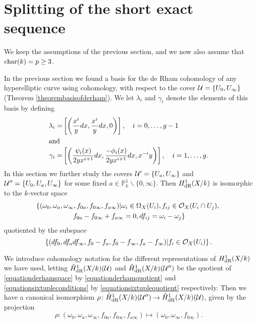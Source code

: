
\section{Splitting of the short exact sequence}


We keep the assumptions of the previous section, and we now also assume that $\operatorname{char}(k) = p \geq 3$.

In the previous section we found a basis for the de Rham cohomology of any hyperelliptic curve using \cech cohomology, with respect to the cover ${\mathcal U} = \{ U_0 , U_\infty\}$ (Theorem \ref{theorembasisofderham}).
We let $\lambda_i$ and $\gamma_i$ denote the elements of this basis by defining
    \begin{align*}
    \lambda_i  = & \left[ \left( \frac{x^i}{y}dx, \frac{x^i}{y}dx, 0\right) \right] ,\quad i=0, \ldots, g-1 \\
    \intertext{and}
    \gamma_i = & \left[ \left ( \frac{\psi_i(x)}{2yx^{i+1}}dx, \frac{-\phi_i(x)}{2yx^{i+1}}dx, x^{-i}y \right) \right], \quad i=1,\ldots ,g.
    \end{align*}
In this section we further study the covers ${\mathcal U}' = \{U_a, U_\infty\}$ and ${\mathcal U}'' = \{U_0, U_a, U_\infty\}$ for some fixed $a \in \mathbb{P}_k^1\backslash \{0, \infty\}$.
Then $H_{\text {dR}}^1(X/k)$ is isomorphic to the $k$-vector space 
    \begin{multline}\label{equationsixtupleconditions}
    \left\{ (\omega_0, \omega_a, \omega_\infty , f_{0a}, f_{0 \infty},f_{a \infty}) | \omega_i \in \Omega_X(U_i), f_{ij} \in {\cal O}_X(U_i \cap U_j), \right. \\ \left. f_{0a} - f_{0\infty} + f_{a \infty} = 0, df_{ij} = \omega_i - \omega_j \right\}
    \end{multline}
quotiented by the subspace 
    \begin{equation}\label{equationsixtuplequotient}
    \left\{( df_0, df_a df_\infty, f_0- f_a, f_0 - f_\infty, f_a - f_\infty ) | f_i \in {\cal O}_X(U_i)\right\}.
    \end{equation}

We introduce \cech cohomology notation for the different representations of $H_{\text {dR}}^1(X/k)$ we have used, letting $\check{H}_{\text {dR}}^1(X/k)({\mathcal U})$ and $\check{H}_{\text {dR}}^1(X/k)({\mathcal U}'')$ be the quotient of \eqref{equationderhamspace} by \eqref{equationderhamquotient} and \eqref{equationsixtupleconditions} by \eqref{equationsixtuplequotient} respectively.
Then we have a canonical isomorphism $\rho\colon \check{H}_{\text {dR}}^1(X/k)({\mathcal U}'') \rightarrow \check{H}_{\text {dR}}^1(X/k)({\mathcal U})$, given by the projection
    \begin{equation}\label{equationdefinitionofrho}
    \rho \colon (\omega_0, \omega_a, \omega_\infty , f_{0a}, f_{0 \infty},f_{a \infty}) \mapsto (\omega_0, \omega_\infty , f_{0 \infty}).
    \end{equation}

